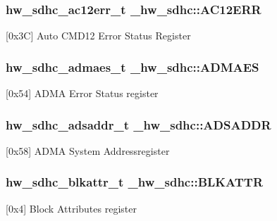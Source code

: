\subsubsection[{\texorpdfstring{A\+C12\+E\+RR}{AC12ERR}}]{ {\bf hw\+\_\+sdhc\+\_\+ac12err\+\_\+t} \+\_\+hw\+\_\+sdhc\+::\+A\+C12\+E\+RR}\hypertarget{struct__hw__sdhc_a75201cbc997f9b64d92ddffb864f2617}{}\label{struct__hw__sdhc_a75201cbc997f9b64d92ddffb864f2617}
\mbox{[}0x3C\mbox{]} Auto C\+M\+D12 Error Status Register 
\subsubsection[{\texorpdfstring{A\+D\+M\+A\+ES}{ADMAES}}]{ {\bf hw\+\_\+sdhc\+\_\+admaes\+\_\+t} \+\_\+hw\+\_\+sdhc\+::\+A\+D\+M\+A\+ES}\hypertarget{struct__hw__sdhc_a53ece25f59f4380795f27a97aac707f0}{}\label{struct__hw__sdhc_a53ece25f59f4380795f27a97aac707f0}
\mbox{[}0x54\mbox{]} A\+D\+MA Error Status register 
\subsubsection[{\texorpdfstring{A\+D\+S\+A\+D\+DR}{ADSADDR}}]{ {\bf hw\+\_\+sdhc\+\_\+adsaddr\+\_\+t} \+\_\+hw\+\_\+sdhc\+::\+A\+D\+S\+A\+D\+DR}\hypertarget{struct__hw__sdhc_aa3d3330b7da5506977f65a5b2f8e8049}{}\label{struct__hw__sdhc_aa3d3330b7da5506977f65a5b2f8e8049}
\mbox{[}0x58\mbox{]} A\+D\+MA System Addressregister 
\subsubsection[{\texorpdfstring{B\+L\+K\+A\+T\+TR}{BLKATTR}}]{ {\bf hw\+\_\+sdhc\+\_\+blkattr\+\_\+t} \+\_\+hw\+\_\+sdhc\+::\+B\+L\+K\+A\+T\+TR}\hypertarget{struct__hw__sdhc_a8a79f734fa65ded10bbf360492220041}{}\label{struct__hw__sdhc_a8a79f734fa65ded10bbf360492220041}
\mbox{[}0x4\mbox{]} Block Attributes register 
